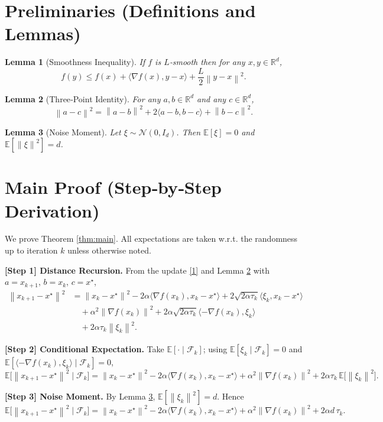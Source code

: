 \documentclass{article}
\newtheorem{lemma}{Lemma}
\newcommand{\EE}{\mathbb{E}}
\newcommand{\RR}{\mathbb{R}}
\newcommand{\norm}[1]{\left\|#1\right\|}
\newcommand{\inner}[2]{\langle #1,#2\rangle}
\begin{document}
\section*{Preliminaries (Definitions and Lemmas)}
\begin{lemma}[Smoothness Inequality]\label{lem:smooth}
If $f$ is $L$‑smooth then for any $x,y\in\RR^d$,
\[
f(y)\le f(x)+\inner{\nabla f(x)}{y-x}+\frac{L}{2}\norm{y-x}^2 .
\tag{6}
\]
\end{lemma}
\begin{lemma}[Three‑Point Identity]\label{lem:three}
For any $a,b\in\RR^d$ and any $c\in\RR^d$,
\[
\norm{a-c}^2=\norm{a-b}^2+2\inner{a-b}{b-c}+\norm{b-c}^2 .
\tag{7}
\]
\end{lemma}
\begin{lemma}[Noise Moment]\label{lem:noise}
Let $\xi\sim\mathcal N(0,I_d)$. Then $\EE[\xi]=0$ and $\EE[\norm{\xi}^2]=d$.
\end{lemma}

\section*{Main Proof (Step‑by‑Step Derivation)}
We prove Theorem \ref{thm:main}. All expectations are taken w.r.t. the randomness up to iteration $k$ unless otherwise noted.

\bigskip
\noindent\textbf{[Step 1] Distance Recursion.}  
From the update \eqref{1} and Lemma \ref{lem:three} with $a=x_{k+1}$, $b=x_k$, $c=x^\star$,
\[
\begin{aligned}
\norm{x_{k+1}-x^\star}^2
&=\norm{x_k-x^\star}^2
-2\alpha\inner{\nabla f(x_k)}{x_k-x^\star}
+2\sqrt{2\alpha\tau_k}\inner{\xi_k}{x_k-x^\star}   \\
&\quad+\alpha^2\norm{\nabla f(x_k)}^2
+2\alpha\sqrt{2\alpha\tau_k}\inner{-\nabla f(x_k)}{\xi_k}   \\
&\quad+2\alpha\tau_k\norm{\xi_k}^2 .
\end{aligned}
\tag{8}
\]

\noindent\textbf{[Step 2] Conditional Expectation.}  
Take $\EE[\cdot\mid\mathcal F_k]$; using $\EE[\xi_k\mid\mathcal F_k]=0$ and $\EE[\inner{-\nabla f(x_k)}{\xi_k}\mid\mathcal F_k]=0$,
\[
\EE\!\bigl[\norm{x_{k+1}-x^\star}^2\mid\mathcal F_k\bigr]
=
\norm{x_k-x^\star}^2
-2\alpha\inner{\nabla f(x_k)}{x_k-x^\star}
+\alpha^2\norm{\nabla f(x_k)}^2
+2\alpha\tau_k\,\EE\!\bigl[\norm{\xi_k}^2\bigr].
\tag{9}
\]

\noindent\textbf{[Step 3] Noise Moment.}  
By Lemma \ref{lem:noise}, $\EE[\norm{\xi_k}^2]=d$. Hence
\[
\EE\!\bigl[\norm{x_{k+1}-x^\star}^2\mid\mathcal F_k\bigr]
=
\norm{x_k-x^\star}^2
-2\alpha\inner{\nabla f(x_k)}{x_k-x^\star}
+\alpha^2\norm{\nabla f(x_k)}^2
+2\alpha d\,\tau_k .
\tag{10}
\]
\end{document}
